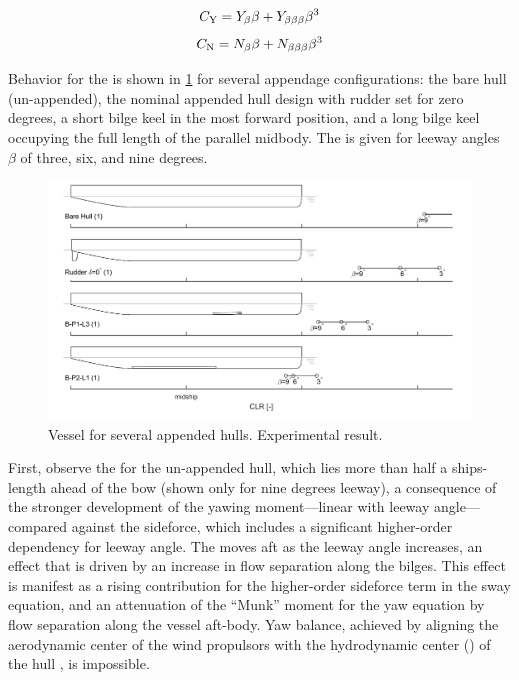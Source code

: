\documentclass[twoside,twocolumn]{article}
\begin{document}
\begin{equation}
C_\mathrm{Y}=Y_{\beta}\beta+Y_{\beta \beta \beta}\beta^{3}
\end{equation}
\begin{equation}
C_\mathrm{N}=N_{\beta}\beta+N_{\beta \beta \beta}\beta^{3}
\end{equation}

Behavior for the \CLR is shown in \cref{fig:CLRdemo} for several appendage configurations: the bare hull (un-appended), the nominal appended hull design with rudder set for zero degrees, a short bilge keel in the most forward position, and a long bilge keel occupying the full length of the parallel midbody. The \CLR is given for leeway angles $\beta$ of three, six, and nine degrees. 

\begin{figure}[!th]
	\centering
	\includegraphics[width=\textwidth]{images/1_CLR_demo}
	\caption{Vessel \CLR for several appended hulls. Experimental result.}
	\label{fig:CLRdemo}
\end{figure}
\noindent
First, observe the \CLR for the un-appended hull, which lies more than half a ships-length ahead of the bow (shown only for nine degrees leeway), a consequence of the stronger development of the yawing moment—linear with leeway angle—compared against the sideforce, which includes a significant higher-order dependency for leeway angle. The \CLR moves aft as the leeway angle increases, an effect that is driven by an increase in flow separation along the bilges. This effect is manifest as a rising contribution for the higher-order sideforce term in the sway equation, and an attenuation of the “Munk” moment for the yaw equation by flow separation along the vessel aft-body. Yaw balance, achieved by aligning the aerodynamic center of the wind propulsors with the hydrodynamic center (\CLR) of the hull \cite{Claughton03}, is impossible.
\end{document}
